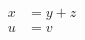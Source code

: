 \documentclass{article}
\begin{document}
\begin{align}x&=y+z\\ u&=v\tag{T}\end{align}
\end{document}
